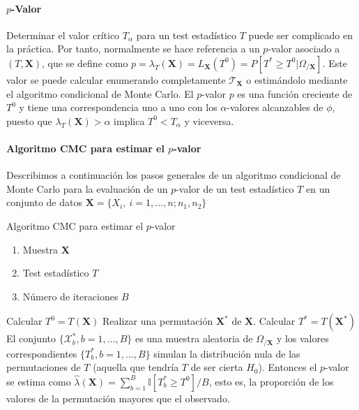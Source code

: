 \paragraph{$p$-Valor} Determinar el valor crítico $T_\alpha$ para un test estadístico $T$ puede ser complicado en la práctica. Por tanto, normalmente se hace referencia a un $p$-valor asociado a $(T, \mathbf{X})$, que se define como $p = \lambda_T(\mathbf{X}) = L_\mathbf{X}(T^0) = P[ T^* \geq T^0 | \Omega_{/\mathbf{X}}]$. Este valor se puede calcular enumerando completamente $\mathcal{T}_\mathbf{X}$ o estimándolo mediante el algoritmo condicional de Monte Carlo. El $p$-valor $p$ es una función creciente de $T^0$ y tiene una  correspondencia uno a uno con los $\alpha$-valores alcanzables de $\phi$, puesto que $\lambda_T(\mathbf{X}) > \alpha$ implica $T^0 < T_\alpha$ y viceversa.

\paragraph{Algoritmo CMC para estimar el $p$-valor}  Describimos a continuación los pasos generales de un algoritmo condicional de Monte Carlo para la evaluación de un $p$-valor de un test estadístico $T$ en un conjunto de datos $\mathbf{X} = \{ X_i, \ i=1, \dots, n; n_1, n_2 \}$

\begin{algorithm}
	\caption{Algoritmo CMC para estimar el $p$-valor}
	\label{alg:CMC-pvalue}
	\begin{algorithmic}[1]
	\REQUIRE
		\begin{enumerate}[a]
		\item Muestra $\mathbf{X}$
		\item Test estadístico $T$
		\item Número de iteraciones $B$
		\end{enumerate}
		\STATE Calcular $T^0 = T(\mathbf{X})$
			\STATE Realizar una permutación $\mathbf{X}^*$ de  $\mathbf{X}$.
			\STATE Calcular $T^* = T(\mathbf{X}^*)$
		\ENDFOR
		\STATE El conjunto $\{ \mathcal{X}^*_b, b = 1, \dots, B \}$ es una muestra aleatoria de $\Omega_{/\mathbf{X}}$ y los valores correspondientes $\{ T^*_b, b = 1, \dots, B \}$ simulan la distribución nula de las permutaciones de $T$ (aquella que tendría $T$ de ser cierta $H_0$). Entonces el $p$-valor se estima como $\hat{\lambda}(\mathbf{X}) = \sum\limits_{b=1}^B \mathbb{I}[T_b^* \geq T^0]/B$, esto es, la proporción de los valores de la permutación mayores que el observado.
	\end{algorithmic}
\end{algorithm}
	
